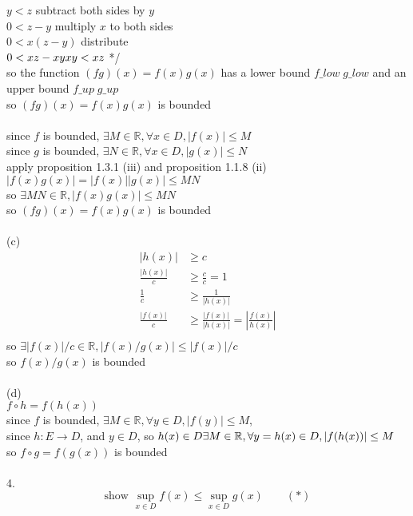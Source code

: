 \documentclass[12pt, border = 4pt, multi]{article} %
\begin{document}
$y < z$ \qquad subtract both sides by $y$\\
$0 < z - y$ \qquad multiply $x$ to both sides\\
$0 < x(z - y)$ \qquad distribute\\
$0 < xz - xy\\
xy < xz$ */\\
so the function $(fg)(x) = f(x)g(x)$ has a lower bound $f\_low\;g\_low$ and an upper bound $f\_up\;g\_up$\\
so $(fg)(x) = f(x)g(x)$ is bounded\\
\\
since $f$ is bounded, $\exists M \in \mathbb{R}, \forall x \in D, |f(x)| \leq M$\\
since $g$ is bounded, $\exists N \in \mathbb{R}, \forall x \in D, |g(x)| \leq N$\\
apply proposition 1.3.1 (iii) and proposition 1.1.8 (ii)\\
$|f(x)g(x)| = |f(x)||g(x)| \leq MN$\\
so $\exists MN \in \mathbb{R}, |f(x)g(x)| \leq MN$\\
so $(fg)(x) = f(x)g(x)$ is bounded\\
\\
(c)
\begin{align*}
|h(x)| &\geq c\\
\frac{|h(x)|}{c} &\geq \frac{c}{c} = 1\\
\frac{1}{c} &\geq \frac{1}{|h(x)|}\\
\frac{|f(x)|}{c} &\geq \frac{|f(x)|}{|h(x)|} =\left|\frac{f(x)}{h(x)}\right|\\
\end{align*}
so $\exists |f(x)| / c \in \mathbb{R}, |f(x) / g(x)| \leq |f(x)| / c$\\
so $f(x) / g(x)$ is bounded\\
\\
(d)\\
$f \circ h = f(h(x))$\\
since $f$ is bounded, $\exists M \in \mathbb{R}, \forall y \in D, |f(y)| \leq M$,\\
since $h: E \rightarrow D$, and $y \in D$, so $h(x) \in D\\
\exists M \in \mathbb{R}, \forall y = h(x) \in D, |f(h(x))| \leq M$\\
so $f \circ g = f(g(x))$ is bounded\\
\\
4.\\
\[\text{show }\sup_{x \in D} f(x) \leq \sup_{x \in D} g(x) \qquad (*)\]
\end{document}
